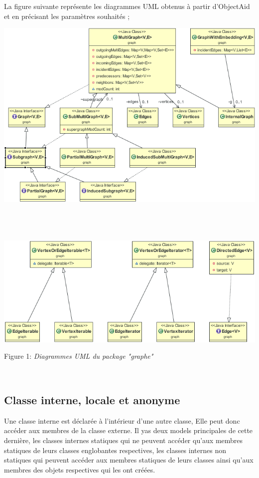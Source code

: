 \documentclass[12pt]{report}
\begin{document}
La figure suivante représente les diagrammes UML obtenus à partir d'ObjectAid et en précisant les paramètres souhaités ;
\newpage

\begin{center}
\includegraphics[width=1\textwidth]{DiagUMLPartie1.png}
\caption{\label{fig:DiagUMLPartie1}}
~\\
~\\
~\\
\includegraphics[width=1\textwidth]{DiagUMLPartie2.png}
\caption{\label{fig:DiagUMLPartie2}\newline Figure 1: \textit{Diagrammes UML du package "graphe" }}
\end{center}

\newpage
~\\
\subsection{Classe interne, locale et anonyme}

Une classe interne est déclarée à l'intérieur d'une autre classe, Elle peut donc accéder aux membres de la classe externe. Il yas deux models principales de cette dernière, les classes internes statiques qui ne peuvent accéder qu'aux membres statiques de leurs classes englobantes respectives, les classes internes non statiques qui peuvent accéder aux membres statiques de leurs classes ainsi qu'aux membres des objets respectives qui les ont créées.\newline
\end{document}
